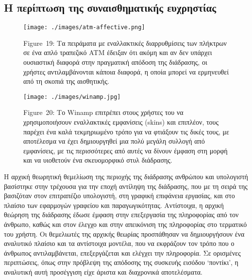 \documentclass[
]{article}
\begin{document}
\hypertarget{ux3b7-ux3c0ux3b5ux3c1ux3afux3c0ux3c4ux3c9ux3c3ux3b7-ux3c4ux3b7ux3c2-ux3c3ux3c5ux3bdux3b1ux3b9ux3c3ux3b8ux3b7ux3bcux3b1ux3c4ux3b9ux3baux3aeux3c2-ux3b5ux3c5ux3c7ux3c1ux3b7ux3c3ux3c4ux3afux3b1ux3c2}{%
\subsection{Η περίπτωση της συναισθηματικής
ευχρηστίας}\label{ux3b7-ux3c0ux3b5ux3c1ux3afux3c0ux3c4ux3c9ux3c3ux3b7-ux3c4ux3b7ux3c2-ux3c3ux3c5ux3bdux3b1ux3b9ux3c3ux3b8ux3b7ux3bcux3b1ux3c4ux3b9ux3baux3aeux3c2-ux3b5ux3c5ux3c7ux3c1ux3b7ux3c3ux3c4ux3afux3b1ux3c2}}

\leavevmode{}%
\begin{figure}
\hypertarget{fig:atm-affective}{%
\centering
\texttt{[image: ./images/atm-affective.png]}
\caption{Figure~19: Τα πειράματα με εναλλακτικές διαρρυθμίσεις των
πλήκτρων σε ένα απλό τραπεζικό ATM έδειξαν ότι ακόμη και αν δεν υπάρχει
ουσιαστική διαφορά στην πραγματική απόδοση της διάδρασης, οι χρήστες
αντιλαμβάνονται κάποια διαφορά, η οποία μπορεί να ερμηνευθεί από τη
σκοπιά της αισθητικής.}\label{fig:atm-affective}
}
\end{figure}

\leavevmode{}%
\begin{figure}
\hypertarget{fig:winamp}{%
\centering
\texttt{[image: ./images/winamp.jpg]}
\caption{Figure~20: Το Winamp επιτρέπει στους χρήστες του να
χρησιμοποιήσουν εναλλακτικές εμφανίσεις (skins) και επιπλέον, τους
παρέχει ένα καλά τεκμηριωμένο τρόπο για να φτιάξουν τις δικές τους, με
αποτέλεσμα να έχει δημιουργηθεί μια πολύ μεγάλη συλλογή από εμφανίσεις,
με τις περισσότερες από αυτές να δίνουν έμφαση στη μορφή και να
υιοθετούν ένα σκευομορφικό στυλ διάδρασης.}\label{fig:winamp}
}
\end{figure}

Η αρχική θεωρητική θεμελίωση της περιοχής της διάδρασης ανθρώπου και
υπολογιστή βασίστηκε στην τρέχουσα για την εποχή αντίληψη της διάδρασης,
που με τη σειρά της βασιζόταν στον επιτραπέζιο υπολογιστή, στη γραφική
επιφάνεια εργασίας, και στο πλαίσιο των εφαρμογών γραφείου και
παραγωγικότητας. Αντίστοιχα, η αρχική θεώρηση της διάδρασης έδωσε έμφαση
στην επεξεργασία της πληροφορίας από τον άνθρωπο, καθώς και στον έλεγχο
και στην απεικόνιση της πληροφορίας στο τερματικό του χρήστη. Οι
θεμελιωτές της αρχικής θεωρίας προσπάθησαν να δημιουργήσουν ένα
αναλυτικό πλαίσιο και τα αντίστοιχα μοντέλα, που να εκφράζουν τον τρόπο
που ο άνθρωπος αντιλαμβάνεται, επεξεργάζεται και ελέγχει την πληροφορία.
Σε ορισμένες περιπτώσεις, όπως στην πρόβλεψη της απόδοσης της συσκευής
εισόδου `ποντίκι', η αναλυτική αυτή προσέγγιση είχε άριστα και
διαχρονικά αποτελέσματα.
\end{document}
